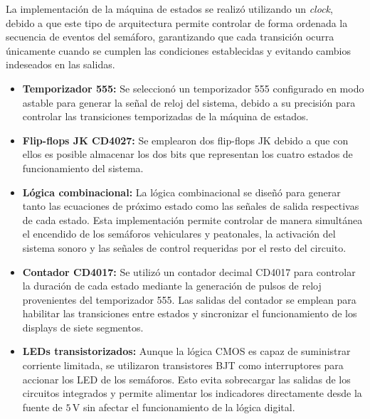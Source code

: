 \documentclass[12pt, journal, onecolumn]{IEEEtran}
\begin{document}
La implementación de la máquina de estados se realizó utilizando un \textit{clock}, debido a que este tipo de arquitectura permite controlar de forma ordenada la secuencia de eventos del semáforo, garantizando que cada transición ocurra únicamente cuando se cumplen las condiciones establecidas y evitando cambios indeseados en las salidas.

\begin{itemize}
    \item \textbf{Temporizador 555:} Se seleccionó un temporizador 555 configurado en modo astable para generar la señal de reloj del sistema, debido a su precisión para controlar las transiciones temporizadas de la máquina de estados.\\

    \item \textbf{Flip-flops JK CD4027:} Se emplearon dos flip-flops JK debido a que con ellos es posible almacenar los dos bits que representan los cuatro estados de funcionamiento del sistema.\\

    \item \textbf{Lógica combinacional:} La lógica combinacional se diseñó para generar tanto las ecuaciones de próximo estado como las señales de salida respectivas de cada estado. Esta implementación permite controlar de manera simultánea el encendido de los semáforos vehiculares y peatonales, la activación del sistema sonoro y las señales de control requeridas por el resto del circuito.\\

    \item \textbf{Contador CD4017:} Se utilizó un contador decimal CD4017 para controlar la duración de cada estado mediante la generación de pulsos de reloj provenientes del temporizador 555. Las salidas del contador se emplean para habilitar las transiciones entre estados y sincronizar el funcionamiento de los displays de siete segmentos.\\

    \item \textbf{LEDs transistorizados:} Aunque la lógica CMOS es capaz de suministrar corriente limitada, se utilizaron transistores BJT como interruptores para accionar los LED de los semáforos. Esto evita sobrecargar las salidas de los circuitos integrados y permite alimentar los indicadores directamente desde la fuente de $5\,\mathrm{V}$ sin afectar el funcionamiento de la lógica digital.\\
\end{itemize}
\end{document}
